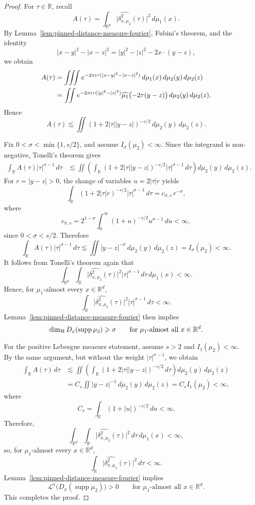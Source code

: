 \documentclass[11pt]{amsart}
\numberwithin{equation}{section}
\renewcommand{\ge}{\geqslant}
\newcommand{\hd}{\dim_{\textup{H}}}
\newcommand{\spt}{\operatorname{supp}}
\theoremstyle{plain}
\theoremstyle{remark}
\newcommand{\R}{\mathbb{R}}
\newcommand{\Rd}{\mathbb{R}^d}
\newcommand{\cL}{\mathcal{L}}
\begin{document}
\begin{proof}
For \(\tau\in\R\), recall
\[
A(\tau)=\int_{\Rd}\bigl|\widehat{\delta_{x,\mu_2}^2}(\tau)\bigr|^2\,d\mu_1(x).
\]
By Lemma~\ref{lem:pinned-distance-measure-fourier}, Fubini's theorem, and the identity
\[
|x-y|^2-|x-z|^2 = |y|^2-|z|^2 - 2x\cdot (y-z),
\]
we obtain
\begin{align}
A(\tau)
&=
\iiint
e^{-2\pi i\tau(|x-y|^2-|x-z|^2)}
\,d\mu_1(x)\,d\mu_2(y)\,d\mu_2(z) \notag\\
&=
\iint
e^{-2\pi i\tau(|y|^2-|z|^2)}
\widehat{\mu_1}\bigl(-2\tau(y-z)\bigr)
\,d\mu_2(y)\,d\mu_2(z). \label{eq:theta-zero-A}
\end{align}
Hence
\[
A(\tau)
\lesssim
\iint
(1+2|\tau||y-z|)^{-s/2}
\,d\mu_2(y)\,d\mu_2(z).
\]

Fix \(0<\sigma<\min\{1,s/2\}\), and assume \(I_\sigma(\mu_2)<\infty\).
Since the integrand is non-negative, Tonelli's theorem gives
\begin{align*}
\int_{\R} A(\tau)|\tau|^{\sigma-1}\,d\tau
&\lesssim
\iint
\left(
\int_{\R}
(1+2|\tau||y-z|)^{-s/2}
|\tau|^{\sigma-1}\,d\tau
\right)
d\mu_2(y)\,d\mu_2(z).
\end{align*}
For \(r=|y-z|>0\), the change of variables \(u=2|\tau|r\) yields
\[
\int_{\R}
(1+2|\tau|r)^{-s/2}|\tau|^{\sigma-1}\,d\tau
=
c_{\sigma,s}\,r^{-\sigma},
\]
where
\[
c_{\sigma,s}
=
2^{1-\sigma}\int_0^\infty (1+u)^{-s/2}u^{\sigma-1}\,du
<\infty,
\]
since \(0<\sigma<s/2\). Therefore
\[
\int_{\R} A(\tau)|\tau|^{\sigma-1}\,d\tau
\lesssim
\iint |y-z|^{-\sigma}\,d\mu_2(y)\,d\mu_2(z)
=
I_\sigma(\mu_2)
<\infty.
\]
It follows from Tonelli's theorem again that
\[
\int_{\Rd}\int_{\R}
\bigl|\widehat{\delta_{x,\mu_2}^2}(\tau)\bigr|^2
|\tau|^{\sigma-1}\,d\tau\,d\mu_1(x)
<\infty.
\]
Hence, for \(\mu_1\)-almost every \(x\in\Rd\),
\[
\int_{\R}
\bigl|\widehat{\delta_{x,\mu_2}^2}(\tau)\bigr|^2
|\tau|^{\sigma-1}\,d\tau
<\infty.
\]
Lemma~\ref{lem:pinned-distance-measure-fourier} then implies
\[
\hd D_x(\spt \mu_2)\ge \sigma
\qquad\text{for $\mu_1$-almost all }x\in\Rd.
\]

For the positive Lebesgue measure statement, assume \(s>2\) and \(I_1(\mu_2)<\infty\).
By the same argument, but without the weight \(|\tau|^{\sigma-1}\), we obtain
\begin{align*}
\int_{\R} A(\tau)\,d\tau
&\lesssim
\iint
\left(
\int_{\R}(1+2|\tau||y-z|)^{-s/2}\,d\tau
\right)
d\mu_2(y)\,d\mu_2(z) \\
&=
C_s
\iint |y-z|^{-1}\,d\mu_2(y)\,d\mu_2(z)
=
C_s I_1(\mu_2)
<\infty,
\end{align*}
where
\[
C_s = \int_{\R}(1+|u|)^{-s/2}\,du < \infty.
\]
Therefore,
\[
\int_{\Rd}\int_{\R}
\bigl|\widehat{\delta_{x,\mu_2}^2}(\tau)\bigr|^2
\,d\tau\,d\mu_1(x)
<\infty,
\]
so, for \(\mu_1\)-almost every \(x\in\Rd\),
\[
\int_{\R}
\bigl|\widehat{\delta_{x,\mu_2}^2}(\tau)\bigr|^2
\,d\tau
<\infty.
\]
Lemma~\ref{lem:pinned-distance-measure-fourier} implies
\[
\cL^1\bigl(D_x(\spt \mu_2)\bigr)>0
\qquad\text{for $\mu_1$-almost all }x\in\Rd.
\]
This completes the proof.
\end{proof}
\end{document}
